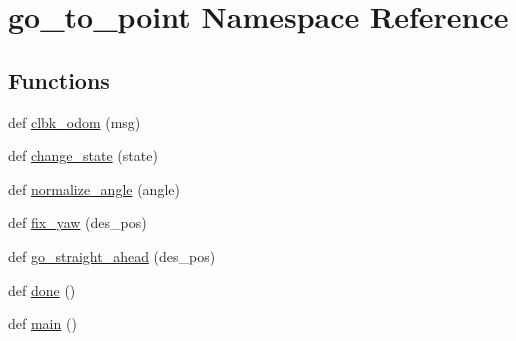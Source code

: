\hypertarget{namespacego__to__point}{}\section{go\+\_\+to\+\_\+point Namespace Reference}
\label{namespacego__to__point}
\subsection*{Functions}
\begin{DoxyCompactItemize}
\item 
def \hyperlink{namespacego__to__point_a36304a9f313b0579f7fc69fa01695524}{clbk\+\_\+odom} (msg)
\item 
def \hyperlink{namespacego__to__point_a31ee48e5cae36821049b572a96b7c8be}{change\+\_\+state} (state)
\item 
def \hyperlink{namespacego__to__point_ac688bb56fa84763ea2edefc30cae032a}{normalize\+\_\+angle} (angle)
\item 
def \hyperlink{namespacego__to__point_a9c3011a3065fcbefcc1c5ad8c9979669}{fix\+\_\+yaw} (des\+\_\+pos)
\item 
def \hyperlink{namespacego__to__point_ac8579665c0fbf665f734476554fac37d}{go\+\_\+straight\+\_\+ahead} (des\+\_\+pos)
\item 
def \hyperlink{namespacego__to__point_ac2587220a4ac9c845bc9c5b0b45d5835}{done} ()
\item 
def \hyperlink{namespacego__to__point_ab92bd6db1ec323a4d795ed6cb40aebe1}{main} ()
\end{DoxyCompactItemize}
